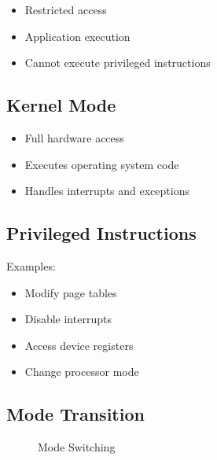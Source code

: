 \begin{itemize}
\item Restricted access
\item Application execution
\item Cannot execute privileged instructions
\end{itemize}

\subsection{Kernel Mode}

\begin{itemize}
\item Full hardware access
\item Executes operating system code
\item Handles interrupts and exceptions
\end{itemize}

\subsection{Privileged Instructions}

Examples:

\begin{itemize}
\item Modify page tables
\item Disable interrupts
\item Access device registers
\item Change processor mode
\end{itemize}

\subsection{Mode Transition}

\begin{figure}[H]
\centering
{}
\caption{Mode Switching}
\end{figure}

